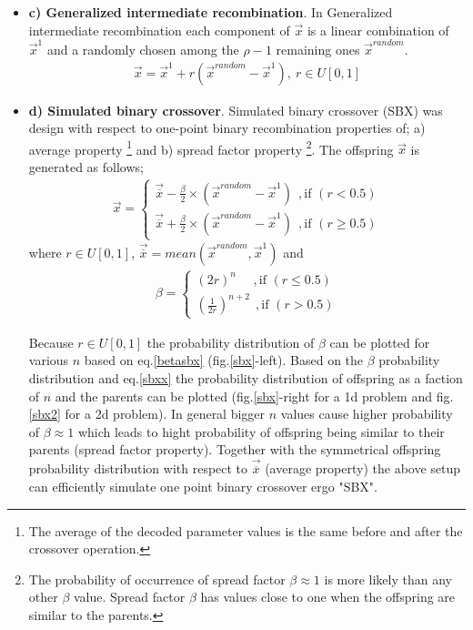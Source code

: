 \begin{itemize}
\item[]{\bf c) Generalized intermediate recombination}.  In Generalized intermediate recombination each component of $\vec{x}$ is a linear combination of $\vec{x}^1$ and a randomly chosen among the $\rho-1$ remaining ones $\vec{x}^{random}$.
\begin{eqnarray}
\nonumber
\vec{x}=\vec{x}^1+r(\vec{x}^{random}-\vec{x}^1),~ r\in U[0,1]
\end{eqnarray}  
 
\item[]{\bf d) Simulated binary crossover}. Simulated binary crossover (SBX) was design with respect to one-point binary recombination properties of; a) average property \footnote{The average of the decoded parameter values is the same
before and after the crossover operation.} and b) spread factor property \footnote{The probability of occurrence of spread factor $\beta \approx 1$ is more likely than any other $\beta$ value. Spread factor $\beta$ has values close to one when the offspring are similar to the parents.}\cite{SBX1}. The offspring $\vec{x}$ is generated as follows;
\begin{eqnarray}
	\vec{x}={\left\{ 
	\begin{array}{ll}
    \vec{\overline{x}} - \frac{\beta}{2} \times (\vec{x}^{random}-\vec{x}^1)~~,\mbox{if $(r < 0.5)$}\\
	\vec{\overline{x}} + \frac{\beta}{2} \times (\vec{x}^{random}-\vec{x}^1)~~,\mbox{if $(r \geq 0.5)$}
    \end{array} \right. }
    \label{sbxx}
\end{eqnarray}  
where $r\in U[0,1]$, $\vec{\overline{x}}=mean(\vec{x}^{random},\vec{x}^1)$  and 
\begin{eqnarray}
	\beta={\left\{ 
	\begin{array}{ll}
    (2r)^{n}~~~~~~,\mbox{if $(r \leq 0.5)$}\\
	\left(\frac{1}{2r}\right)^{n+2}~~,\mbox{if $(r > 0.5)$}
    \end{array} \right. }
    \label{betasbx}
\end{eqnarray}

Because $r\in U[0,1]$ the probability distribution of $\beta$ can be plotted for various $n$ based on eq.\ref{betasbx} (fig.\ref{sbx}-left). Based on the $\beta$ probability distribution and eq.\ref{sbxx} the probability distribution of offspring as a faction of $n$ and the parents can be plotted (fig.\ref{sbx}-right for a 1d problem and fig.\ref{sbx2} for a 2d problem). In general bigger $n$ values cause higher probability of $\beta \approx 1$ which leads to hight probability of offspring being similar to their parents (spread factor property). Together with the symmetrical offspring probability distribution with respect to $\vec{\overline{x}}$ (average property) the above setup can efficiently simulate one point binary crossover ergo "SBX".    


\end{itemize}
